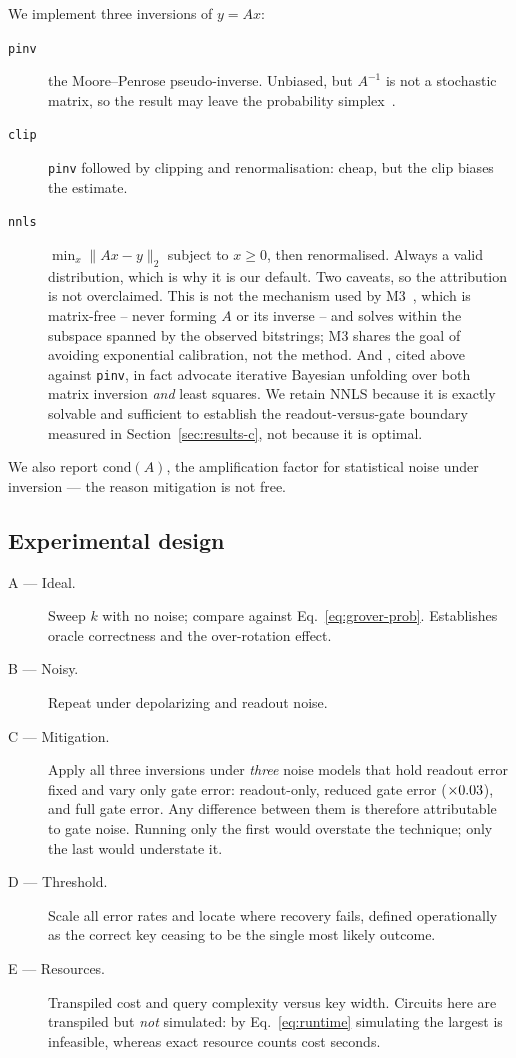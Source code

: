 \documentclass[11pt,a4paper]{article}
\begin{document}
We implement three inversions of $y = Ax$:
\begin{description}
  \item[\texttt{pinv}] the Moore--Penrose pseudo-inverse. Unbiased, but $A^{-1}$
    is not a stochastic matrix, so the result may leave the probability
    simplex~\citep{nachman2020}.
  \item[\texttt{clip}] \texttt{pinv} followed by clipping and renormalisation:
    cheap, but the clip biases the estimate.
  \item[\texttt{nnls}] $\min_x \|Ax - y\|_2$ subject to $x \ge 0$, then
    renormalised. Always a valid distribution, which is why it is our default.
    Two caveats, so the attribution is not overclaimed. This is not the
    mechanism used by M3~\citep{nation2021}, which is matrix-free -- never
    forming $A$ or its inverse -- and solves within the subspace spanned by the
    observed bitstrings; M3 shares the goal of avoiding exponential calibration,
    not the method. And \citet{nachman2020}, cited above against \texttt{pinv},
    in fact advocate iterative Bayesian unfolding over both matrix inversion
    \emph{and} least squares. We retain NNLS because it is exactly solvable and
    sufficient to establish the readout-versus-gate boundary measured in
    Section~\ref{sec:results-c}, not because it is optimal.
\end{description}
We also report $\mathrm{cond}(A)$, the amplification factor for statistical
noise under inversion --- the reason mitigation is not free.

\subsection{Experimental design}

\begin{description}
  \item[A --- Ideal.] Sweep $k$ with no noise; compare against
    Eq.~\eqref{eq:grover-prob}. Establishes oracle correctness and the
    over-rotation effect.
  \item[B --- Noisy.] Repeat under depolarizing and readout noise.
  \item[C --- Mitigation.] Apply all three inversions under \emph{three} noise
    models that hold readout error fixed and vary only gate error:
    readout-only, reduced gate error ($\times0.03$), and full gate
    error. Any difference between them is therefore attributable to gate noise.
    Running only the first would overstate the technique; only the last would
    understate it.
  \item[D --- Threshold.] Scale all error rates and locate where recovery fails,
    defined operationally as the correct key ceasing to be the single most
    likely outcome.
  \item[E --- Resources.] Transpiled cost and query complexity versus key
    width. Circuits here are transpiled but \emph{not} simulated: by
    Eq.~\eqref{eq:runtime} simulating the largest is infeasible, whereas exact
    resource counts cost seconds.
\end{description}
\end{document}
